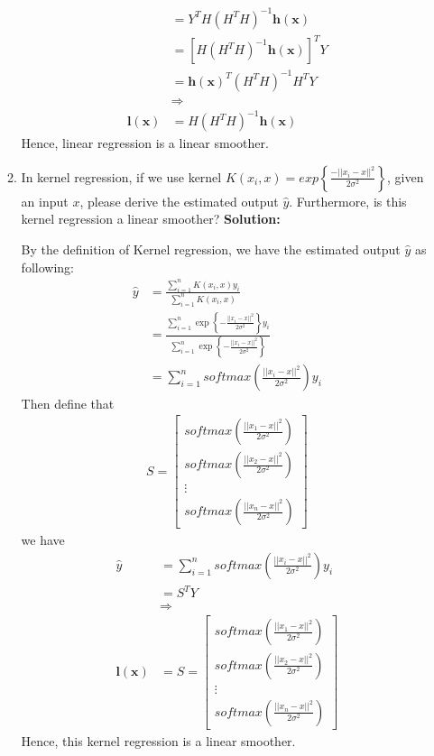 \documentclass{article}
\renewcommand{\b}[1]{\bm{#1}}
\begin{document}
\begin{enumerate}
\begin{enumerate}
\begin{align*}
            &= Y^TH\left(H^TH\right)^{-1}\b{h(x)}\\
            &= \left[H\left(H^TH\right)^{-1}\b{h(x)}\right]^TY\\
            &= \b{h(x)}^T\left(H^TH\right)^{-1}H^TY\\
            &\Rightarrow\\
            \b{l(x)} &= H\left(H^TH\right)^{-1}\b{h(x)}
          \end{align*}
          Hence, linear regression is a linear smoother.
		      \item In kernel regression, if we use kernel $K(x_i,x)=exp\left\{\frac{-||x_i-x||^2}{2\sigma^2}\right\}$, given an input $x$, please derive the estimated output $\hat{y}$. Furthermore, is this kernel regression a linear smoother?\newline
		      {\bf Solution:}
          \par By the definition of Kernel regression, we have the estimated output $\hat{y}$ as following:
          \begin{align*}
            \hat{y} &= \frac{\sum_{i=1}^nK(x_i,x)y_i}{\sum_{i=1}^nK(x_i,x)}\\
            &= \frac{\sum_{i=1}^n \exp{\left\{-\frac{||x_i-x||^2}{2\sigma^2}\right\}}y_i}{\sum_{i=1}^n \exp{\left\{-\frac{||x_i-x||^2}{2\sigma^2}\right\}}}\\
            &= \sum_{i=1}^n softmax\left(\frac{||x_i-x||^2}{2\sigma^2}\right)y_i
          \end{align*}
          Then define that 
          \begin{align*}
            S = \begin{bmatrix}
              softmax\left(\frac{||x_1-x||^2}{2\sigma^2}\right)\\
              softmax\left(\frac{||x_2-x||^2}{2\sigma^2}\right)\\
              \vdots\\
              softmax\left(\frac{||x_n-x||^2}{2\sigma^2}\right)
            \end{bmatrix}
          \end{align*}
          we have
          \begin{align*}
            \hat{y} &= \sum_{i=1}^n softmax\left(\frac{||x_i-x||^2}{2\sigma^2}\right)y_i\\
            &= S^TY\\
            &\Rightarrow\\
            \b{l(x)} &= S = \begin{bmatrix}
              softmax\left(\frac{||x_1-x||^2}{2\sigma^2}\right)\\
              softmax\left(\frac{||x_2-x||^2}{2\sigma^2}\right)\\
              \vdots\\
              softmax\left(\frac{||x_n-x||^2}{2\sigma^2}\right)
            \end{bmatrix}
          \end{align*}
          Hence, this kernel regression is a linear smoother.
	      \end{enumerate}
\end{enumerate}
\end{document}
